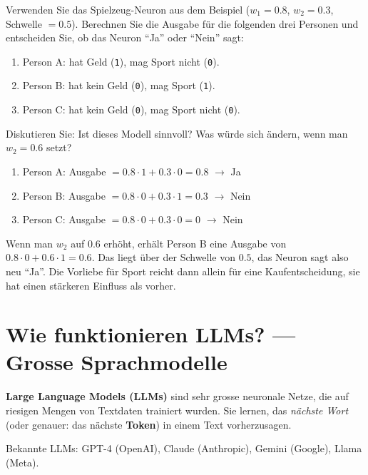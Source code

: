 \begin{myexercise}
Verwenden Sie das Spielzeug-Neuron aus dem Beispiel ($w_1 = 0.8$, $w_2 = 0.3$,
Schwelle $= 0.5$). Berechnen Sie die Ausgabe für die folgenden drei Personen und
entscheiden Sie, ob das Neuron \enquote{Ja} oder \enquote{Nein} sagt:

\begin{enumerate}
    \item Person A: hat Geld (\texttt{1}), mag Sport nicht (\texttt{0}).
    \item Person B: hat kein Geld (\texttt{0}), mag Sport (\texttt{1}).
    \item Person C: hat kein Geld (\texttt{0}), mag Sport nicht (\texttt{0}).
\end{enumerate}

Diskutieren Sie: Ist dieses Modell sinnvoll? Was würde sich ändern, wenn man
$w_2 = 0.6$ setzt?
\begin{myanswer}
\begin{enumerate}
    \item Person A: Ausgabe $= 0.8 \cdot 1 + 0.3 \cdot 0 = 0.8$ $\rightarrow$ Ja
    \item Person B: Ausgabe $= 0.8 \cdot 0 + 0.3 \cdot 1 = 0.3$ $\rightarrow$ Nein
    \item Person C: Ausgabe $= 0.8 \cdot 0 + 0.3 \cdot 0 = 0$ $\rightarrow$ Nein
\end{enumerate}
Wenn man $w_2$ auf 0.6 erhöht, erhält Person B eine Ausgabe von $0.8 \cdot 0 + 0.6 \cdot 1 = 0.6$. Das liegt über der Schwelle von $0.5$, das Neuron sagt also neu \enquote{Ja}. Die Vorliebe für Sport reicht dann allein für eine Kaufentscheidung, sie hat einen stärkeren Einfluss als vorher.
\end{myanswer}
\end{myexercise}

\section{Wie funktionieren LLMs? --- Grosse Sprachmodelle}

\begin{mydefinition}
\textbf{Large Language Models (LLMs)} sind sehr grosse neuronale Netze, die auf
riesigen Mengen von Textdaten trainiert wurden. Sie lernen, das \emph{nächste Wort}
(oder genauer: das nächste \textbf{Token}) in einem Text vorherzusagen.

Bekannte LLMs: GPT-4 (OpenAI), Claude (Anthropic), Gemini (Google), Llama (Meta).
\end{mydefinition}

